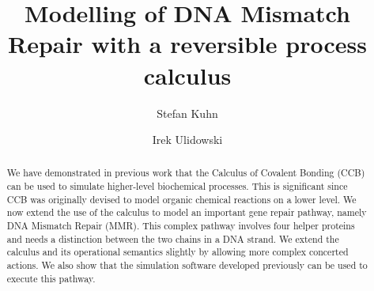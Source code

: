 \documentclass[review]{elsarticle}
\begin{document}
\begin{frontmatter}

\title{Modelling of DNA Mismatch Repair with a reversible process calculus}

\author{Stefan Kuhn}%
\address{School of Computer Science and Informatics, De Montfort University, Leicester, UK}

\author{Irek Ulidowski}%
\address{School of Informatics, University of Leicester, Leicester, UK}


%

\begin{abstract}
%
%
We have demonstrated in previous work that the Calculus of Covalent Bonding (CCB) can be used to simulate higher-level biochemical processes. This is significant since CCB was originally devised to model organic chemical reactions on a lower level. We now extend the use of the calculus  to model an important gene repair pathway, namely DNA Mismatch Repair (MMR). This complex pathway involves four helper proteins and needs a distinction between the two chains in a DNA strand. 
We extend the calculus and its operational semantics slightly by allowing more complex concerted actions.
We also show that the simulation software developed previously can be used to execute this pathway.
\end{abstract}


\end{frontmatter}
\end{document}
